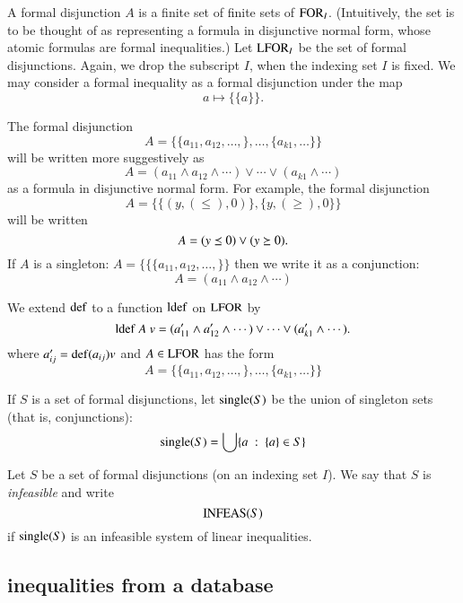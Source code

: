 
\begin{definition}
A formal disjunction $A$ is a finite set of finite sets of
${\operatorname{FOR}}_I$. (Intuitively, the set is to be thought of as
representing a formula in disjunctive normal form, whose atomic
formulas are formal inequalities.) Let ${\operatorname{LFOR}}_I$ be the set of
formal disjunctions. Again, we drop the subscript $I$, when the
indexing set $I$ is fixed.  We may consider a formal inequality as
a formal disjunction under the map
    $$a \mapsto \{\{a\}\}.$$
\end{definition}

\begin{remark}
The formal disjunction
    $$A = \{\{a_{11},a_{12},\ldots,\},\ldots,\{a_{k1},\ldots\}\}$$
will be written more suggestively as
    $$A = (a_{11}\wedge a_{12}\wedge\cdots) \vee \cdots \vee (a_{k1}\wedge
    \cdots)$$
as a formula in disjunctive normal form.  For example, the formal
disjunction
    $$A =  \{\{(y,(\le),0)\},\{y,(\ge),0\}\}$$
will be written
    $$A = (y\preceq 0) \vee (y \succeq 0).$$
If $A$ is a singleton: $A = \{\{\{a_{11},a_{12},\ldots,\}\}$ then
we write it as a conjunction:
    $$
    A = (a_{11}\wedge a_{12}\wedge\cdots)
    $$
\end{remark}

We extend ${\operatorname{def}}$ to a function ${\operatorname{ldef}}$ on ${\operatorname{LFOR}}$ by
    $${\operatorname{ldef}}\ A \ v  =
    (a'_{11}\wedge a'_{12}\wedge\cdots) \vee \cdots \vee (a'_{k1}\wedge
    \cdots).$$
where $a'_{ij} = {\operatorname{def}}(a_{ij}) v$ and $A\in {\operatorname{LFOR}}$ has the
form
    $$
    A = \{\{a_{11},a_{12},\ldots,\},\ldots,\{a_{k1},\ldots\}\}$$

If $S$ is a set of formal disjunctions, let ${\operatorname{single}}(S)$ be
the union of singleton sets (that is, conjunctions):
    $$
    {\operatorname{single}}(S) = \bigcup \{a \ :\  \{a\} \in S\}
    $$

\begin{definition}[infeasible]
Let $S$ be a set of formal disjunctions (on an indexing set $I$).
We say that $S$ is {\it infeasible} and write
    $${\operatorname{INFEAS}}(S)$$
if ${\operatorname{single}}(S)$ is an infeasible system of linear
inequalities.
\end{definition}


\subsection{inequalities from a database}
\label{sec:lookup}

